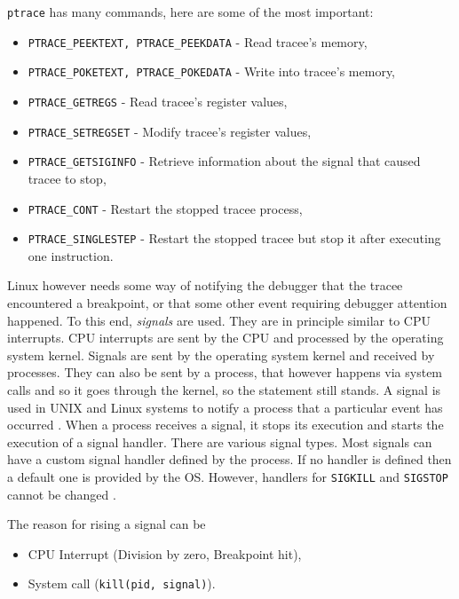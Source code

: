 \texttt{ptrace} has many commands, here are some of the most important:
\begin{itemize}
    \item \texttt{PTRACE\_PEEKTEXT, PTRACE\_PEEKDATA} - Read tracee's memory,
    \item \texttt{PTRACE\_POKETEXT, PTRACE\_POKEDATA} - Write into tracee's
          memory,
    \item \texttt{PTRACE\_GETREGS} - Read tracee's register values,
    \item \texttt{PTRACE\_SETREGSET} - Modify tracee's register values,
    \item \texttt{PTRACE\_GETSIGINFO} - Retrieve information about the signal
                                        that caused tracee to stop,
    \item \texttt{PTRACE\_CONT} - Restart the stopped tracee process,
    \item \texttt{PTRACE\_SINGLESTEP} - Restart the stopped tracee but
          stop it after executing one instruction.
\end{itemize}

Linux however needs some way of notifying the debugger that the tracee
encountered a breakpoint, or that some other event requiring debugger attention
happened. To this end, \textit{signals} are used. They are in principle similar
to CPU interrupts. CPU interrupts are sent by the CPU and processed by the
operating system kernel. Signals are sent by the operating system kernel and
received by processes. They can also be sent by a process, that however happens
via system calls and so it goes through the kernel, so the statement still
stands. A signal is used in UNIX and Linux systems to notify a process that a
particular event has occurred \cite{os-concepts}.  When a process receives a
signal, it stops its execution and starts the execution of a signal handler.
There are various signal types. Most signals can have a custom signal handler
defined by the process. If no handler is defined then a default one is provided
by the OS. However, handlers for \texttt{SIGKILL} and \texttt{SIGSTOP} cannot
be changed \cite{signals}.

The reason for rising a signal can be 
\begin{itemize}
    \item CPU Interrupt (Division by zero, Breakpoint hit),
    \item System call (\texttt{kill(pid, signal)}).
\end{itemize}

